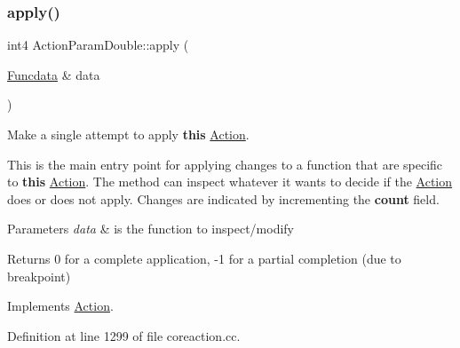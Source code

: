 \subsubsection{\texorpdfstring{apply()}{apply()}}
{\footnotesize\ttfamily int4 Action\+Param\+Double\+::apply (\begin{DoxyParamCaption}\item[{\mbox{\hyperlink{class_funcdata}{Funcdata}} \&}]{data }\end{DoxyParamCaption})\hspace{0.3cm}{\ttfamily [virtual]}}



Make a single attempt to apply {\bfseries{this}} \mbox{\hyperlink{class_action}{Action}}. 

This is the main entry point for applying changes to a function that are specific to {\bfseries{this}} \mbox{\hyperlink{class_action}{Action}}. The method can inspect whatever it wants to decide if the \mbox{\hyperlink{class_action}{Action}} does or does not apply. Changes are indicated by incrementing the {\bfseries{count}} field. 
\begin{DoxyParams}{Parameters}
{\em data} & is the function to inspect/modify \\
\hline
\end{DoxyParams}
\begin{DoxyReturn}{Returns}
0 for a complete application, -\/1 for a partial completion (due to breakpoint) 
\end{DoxyReturn}


Implements \mbox{\hyperlink{class_action_aac1c3999d6c685b15f5d9765a4d04173}{Action}}.



Definition at line 1299 of file coreaction.\+cc.

